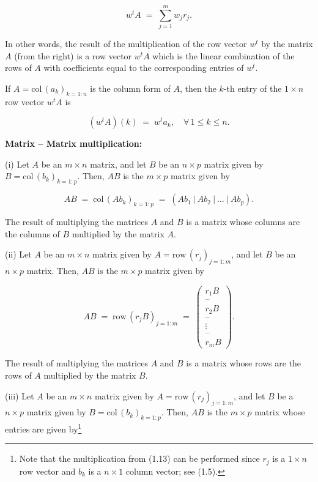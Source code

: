 \begin{equation}
w^t A \;=\; \sum_{j=1}^m w_j r_j.
\end{equation}

In other words, the result of the multiplication of the row vector $w^t$ by
the matrix $A$ (from the right) is a row vector $w^tA$ which is the linear
combination of the rows of $A$ with coefficients equal to the corresponding
entries of $w^t$.

If $A=\mathrm{col}\,(a_k)_{k=1:n}$ is the column form of $A$, then the
$k$-th entry of the $1\times n$ row vector $w^tA$ is

\begin{equation}
(w^tA)(k) \;=\; w^t a_k, \quad \forall\, 1\le k\le n.
\end{equation}

\medskip\noindent\textbf{Matrix -- Matrix multiplication:}\par
(i) Let $A$ be an $m\times n$ matrix, and let $B$ be an $n\times p$ matrix
given by $B=\mathrm{col}\,(b_k)_{k=1:p}$. Then, $AB$ is the $m\times p$
matrix given by

\begin{equation}
AB \;=\; \mathrm{col}\,(Ab_k)_{k=1:p} \;=\; (Ab_1\ |\ Ab_2\ |\ \ldots\ |\ Ab_p).
\end{equation}

The result of multiplying the matrices $A$ and $B$ is a matrix whose
columns are the columns of $B$ multiplied by the matrix $A$.

(ii) Let $A$ be an $m\times n$ matrix given by $A=\mathrm{row}\,(r_j)_{j=1:m}$,
and let $B$ be an $n\times p$ matrix. Then, $AB$ is the $m\times p$ matrix
given by

\begin{equation}
AB \;=\; \mathrm{row}\,(r_jB)_{j=1:m} \;=\;
\begin{pmatrix} r_1B \\ \text{--} \\ r_2B \\ \text{--} \\ \vdots \\ \text{--} \\ r_mB \end{pmatrix}.
\end{equation}

The result of multiplying the matrices $A$ and $B$ is a matrix whose rows
are the rows of $A$ multiplied by the matrix $B$.

(iii) Let $A$ be an $m\times n$ matrix given by $A=\mathrm{row}\,(r_j)_{j=1:m}$,
and let $B$ be a $n\times p$ matrix given by $B=\mathrm{col}\,(b_k)_{k=1:p}$.
Then, $AB$ is the $m\times p$ matrix whose entries are given
by\footnote{Note that the multiplication from (1.13) can be performed since
$r_j$ is a $1\times n$ row vector and $b_k$ is a $n\times 1$ column vector;
see (1.5).}


